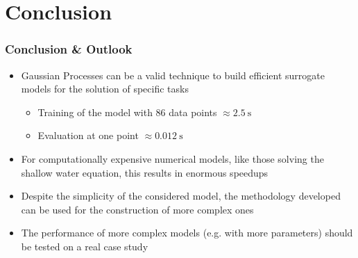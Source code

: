 \documentclass[xcolor=dvipsnames, USenglish]{beamer}  %
\begin{document}
\section{Conclusion}
  \begin{frame}
    \frametitle{Conclusion \& Outlook}
    \begin{itemize}
    \itemsep0em
      \item Gaussian Processes can be a valid technique to build efficient
            surrogate models for the solution of specific tasks
            \begin{itemize}
            \itemsep0em
              \item Training of the model with \num{86} data points $\approx \SI{2.5}{\second}$
              \item Evaluation at one point $\approx \SI{0.012}{\s}$
            \end{itemize}
      \item For computationally expensive numerical models, like those solving
            the shallow water equation, this results in enormous speedups
      \item Despite the simplicity of the considered model, the methodology
            developed can be used for the construction of more complex ones
      \item The performance of more complex models (e.g. with more parameters)
            should be tested on a real case study
    \end{itemize}
    
  \end{frame}
\end{document}
